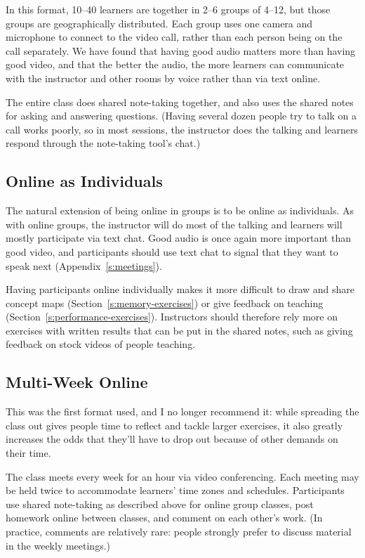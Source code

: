 In this format, 10--40 learners are together in 2--6 groups of 4--12, but
those groups are geographically distributed. Each group uses one camera
and microphone to connect to the video call, rather than each person
being on the call separately. We have found that having good audio
matters more than having good video, and that the better the audio, the
more learners can communicate with the instructor and other rooms by
voice rather than via text online.

The entire class does shared note-taking together, and also uses the
shared notes for asking and answering questions. (Having several dozen
people try to talk on a call works poorly, so in most sessions, the
instructor does the talking and learners respond through the note-taking
tool's chat.)

\subsection*{Online as Individuals}

The natural extension of being online in groups is to be online as
individuals. As with online groups, the instructor will do most of the
talking and learners will mostly participate via text chat. Good audio
is once again more important than good video, and participants should
use text chat to signal that they want to speak next
(Appendix~\ref{s:meetings}).

Having participants online individually makes it more difficult to draw
and share concept maps (Section~\ref{s:memory-exercises}) or give
feedback on teaching (Section~\ref{s:performance-exercises}). Instructors
should therefore rely more on exercises with written results that can be
put in the shared notes, such as giving feedback on stock videos of
people teaching.

\subsection*{Multi-Week Online}

This was the first format used, and I no longer recommend it: while
spreading the class out gives people time to reflect and tackle larger
exercises, it also greatly increases the odds that they'll have to drop
out because of other demands on their time.

The class meets every week for an hour via video conferencing. Each
meeting may be held twice to accommodate learners' time zones and
schedules. Participants use shared note-taking as described above for
online group classes, post homework online between classes, and comment
on each other's work. (In practice, comments are relatively rare: people
strongly prefer to discuss material in the weekly meetings.)

